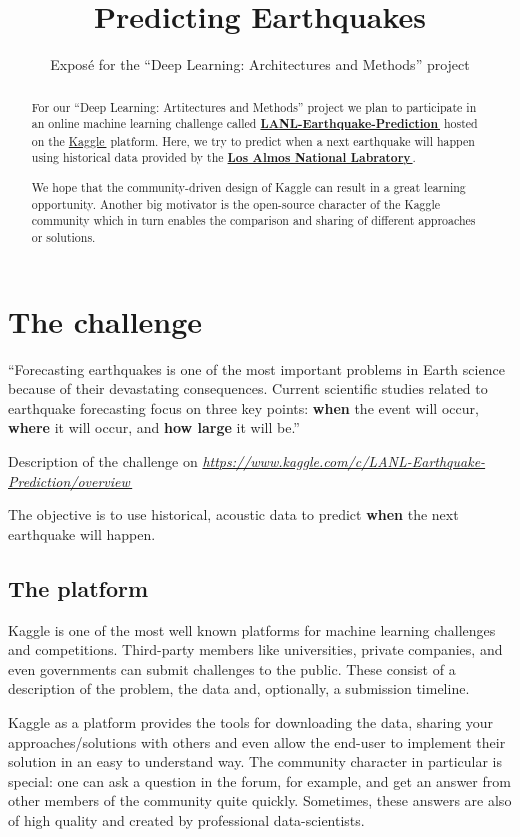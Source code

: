 \documentclass[colorback,accentcolor=tud9c,12pt]{tudreport}
\title{Predicting Earthquakes}
\subtitle{Expos\'{e} for the ``Deep Learning: Architectures and Methods'' project}
\let\orighref\href
\renewcommand{\href}[2]{\orighref{#1}{#2\,\faExternalLink}}
\begin{document}
	\maketitle
	\begin{abstract}
		For our ``Deep Learning: Artitectures and Methods'' project we plan to participate in an online machine learning challenge called 
		\textbf{\href{https://www.kaggle.com/c/LANL-Earthquake-Prediction/overview}{LANL-Earthquake-Prediction}} hosted on the \href{https://www.kaggle.com}{Kaggle} platform.
		Here, we try to predict when a next earthquake will happen using historical data provided by the \textbf{\href{https://www.lanl.gov/}{Los Almos National Labratory}}.
		
		We hope that the community-driven design of Kaggle can result in a great learning opportunity.
		Another big motivator is the open-source character of the Kaggle community which in turn enables the comparison and sharing of different approaches or solutions.
	\end{abstract}

	\chapter{The challenge}
	
	\epigraph{``Forecasting earthquakes is one of the most important problems in Earth science because of their devastating consequences. Current scientific studies related to earthquake forecasting focus on three key points: \textbf{when} the event will occur, \textbf{where} it will occur, and \textbf{how large} it will be.''}{Description of the challenge on \textit{\href{https://www.kaggle.com/c/LANL-Earthquake-Prediction/overview}{https://www.kaggle.com/c/LANL-Earthquake-Prediction/overview}}}
	
	The objective is to use historical, acoustic data to predict \textbf{when} the next earthquake will happen.
	
	
	\section{The platform}
	Kaggle is one of the most well known platforms for machine learning challenges and competitions.
	Third-party members like universities, private companies, and even governments can submit challenges to the public. These consist of a description of the problem, the data and, optionally, a submission timeline.
	
	Kaggle as a platform provides the tools for downloading the data, sharing your approaches/solutions with others and even allow the end-user to implement their solution in an easy to understand way.
	The community character in particular is special: one can ask a question in the forum, for example, and get an answer from other members of the community quite quickly. Sometimes, these answers are also of high quality and created by professional data-scientists.
	
\end{document}

